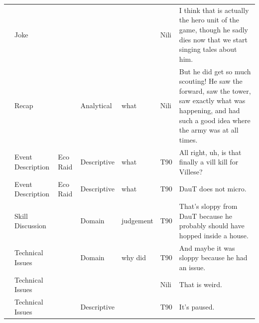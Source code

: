 {\begin{longtable}{@{}>{\theAppRow}r|L{2.3cm}L{2.2cm}L{1.4cm}L{2.2cm}L{0.5cm}U{5.6cm}@{}}
    & Joke                  &                      &             &                   & Nili    & I think that is actually the hero unit of the game, though he sadly dies now that we start singing tales about him.                                                                                                      \\
    & Recap                 &                      & Analytical  & what              & Nili    & But he did get so much scouting! He saw the forward, saw the tower, saw exactly what was happening, and had such a good idea where the army was at all times.                                                            \\
    & Event Description     & Eco Raid             & Descriptive   & what              & T90     & All right, uh, is that finally a vill kill for Villese?                                                                                                                                                                  \\
    & Event Description     & Eco Raid             & Descriptive   & what              & T90     & DauT does not micro.                                                                                                                                                                                                     \\
    & Skill Discussion      &                      & Domain      & judgement         & T90     & That's sloppy from DauT because he probably should have hopped inside a house.                                                                                                                                           \\
    & Technical Issues      &                      & Domain      & why did           & T90     & And maybe it was sloppy because he had an issue.                                                                                                                                                                         \\
    & Technical Issues      &                      &             &                   & Nili    & That is weird.                                                                                                                                                                                                           \\
    & Technical Issues      &                      & Descriptive   &                   & T90     & It's paused.                                                                                                                                                                                                             \\

\end{longtable}}
